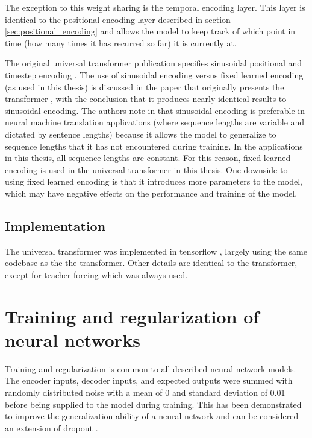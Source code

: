 The exception to this weight sharing is the temporal encoding layer.
This layer is identical to the positional encoding layer described in section \ref{sec:positional_encoding} and allows the model to keep track of which point in time (how many times it has recurred so far) it is currently at.

The original universal transformer publication specifies sinusoidal positional and timestep encoding \cite{Dehghani2018}.
The use of sinusoidal encoding versus fixed learned encoding (as used in this thesis) is discussed in the paper that originally presents the transformer \cite{Vaswani2017}, with the conclusion that it produces nearly identical results to sinusoidal encoding.
The authors note in \cite{Vaswani2017} that sinusoidal encoding is preferable in neural machine translation applications (where sequence lengths are variable and dictated by sentence lengths) because it allows the model to generalize to sequence lengths that it has not encountered during training.
In the applications in this thesis, all sequence lengths are constant.
For this reason, fixed learned encoding is used in the universal transformer in this thesis.
One downside to using fixed learned encoding is that it introduces more parameters to the model, which may have negative effects on the performance and training of the model.


\subsection{Implementation}
The universal transformer was implemented in tensorflow \cite{tensorflow2015-whitepaper}, largely using the same codebase as the the transformer.
Other details are identical to the transformer, except for teacher forcing which was always used.


\section{Training and regularization of neural networks}
\label{train-reg}
Training and regularization is common to all described neural network models.
The encoder inputs, decoder inputs, and expected outputs were summed with randomly distributed noise with a mean of 0 and standard deviation of 0.01 before being supplied to the model during training.
This has been demonstrated to improve the generalization ability of a neural network \cite{Wang1999} \cite{Brown2003} and can be considered an extension of dropout \cite{srivastava14a}.

